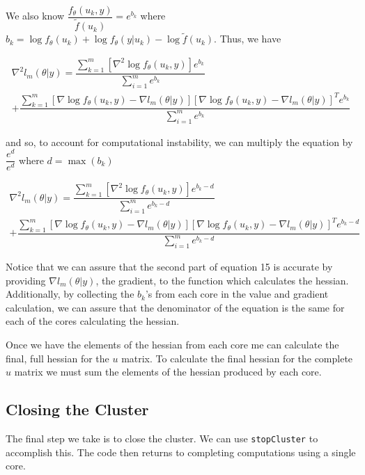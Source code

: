\documentclass{article}
\begin{document}
\noindent We also know $\dfrac{f_\theta(u_k, y)}{\tilde{f}(u_k)} = e^{b_k}$ where $b_k = \log f_\theta (u_k) + \log f_\theta (y|u_k) - \log  \tilde{f} (u_k)$. Thus, we have

\begin{multline}
\nabla^2 l_m(\theta|y)= \dfrac{   \sum_{k=1}^m \left[ \nabla^2 \log f_\theta(u_k,y)     \right]  e^{b_k} }{\sum\limits_{i=1}^m e^{b_k}}\\
+ \dfrac{   \sum_{k=1}^m \left[ \nabla \log f_\theta(u_k,y)  - \nabla l_m(\theta|y)   \right] \left[ \nabla \log f_\theta(u_k,y)  -\nabla l_m(\theta|y)  \right]^T  e^{b_k}   }{\sum\limits_{i=1}^m e^{b_k}}
\end{multline}

\noindent and so, to account for computational instability, we can multiply the equation by $\dfrac{e^d}{e^d}$ where $d=\max(b_k)$

\begin{multline}
\nabla^2 l_m(\theta|y)= \dfrac{   \sum_{k=1}^m \left[ \nabla^2 \log f_\theta(u_k,y)     \right]  e^{b_k-d} }{\sum\limits_{i=1}^m e^{b_k-d}}\\
+ \dfrac{   \sum_{k=1}^m \left[ \nabla \log f_\theta(u_k,y)  - \nabla l_m(\theta|y)   \right] \left[ \nabla \log f_\theta(u_k,y)  -\nabla l_m(\theta|y)  \right]^T  e^{b_k-d}   }{\sum\limits_{i=1}^m e^{b_k-d}}
\end{multline}

\noindent Notice that we can assure that the second part of equation 15 is accurate by providing $\nabla l_m (\theta|y)$, the gradient, to the function which calculates the hessian. Additionally, by collecting the $b_k$'s from each core in the value and gradient calculation, we can assure that the denominator of the equation is the same for each of the cores calculating the hessian. 

Once we have the elements of the hessian from each core me can calculate the final, full hessian for the $u$ matrix. To calculate the final hessian for the complete $u$ matrix we must sum the elements of the hessian produced by each core. 

\subsection{Closing the Cluster}
The final step we take is to close the cluster. We can use \texttt{stopCluster} to accomplish this. The code then returns to completing computations using a single core. 
\end{document}
